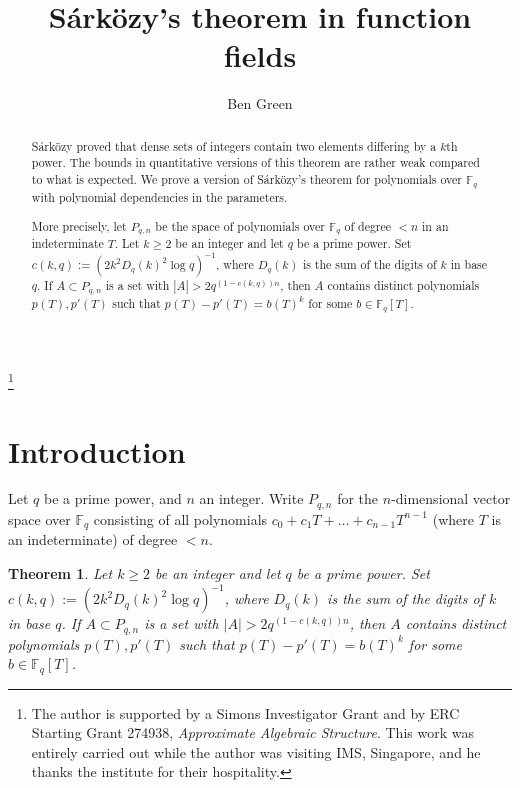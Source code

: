 \documentclass[12pt,reqno]{amsart}
\newtheorem{theorem}{Theorem}[section]
\theoremstyle{definition}
\renewcommand{\geq}{\geqslant}
\def\F{\mathbb{F}}
\numberwithin{equation}{section}
\begin{document}
\title[S\'ark\"ozy's theorem in function fields]{S\'ark\"ozy's theorem in function fields}


\author{Ben Green}
\address{Mathematical Institute, Radcliffe Observatory Quarter, Woodstock Rd, Oxford OX2 6GG}

\thanks{The author is supported by a Simons Investigator Grant and by ERC Starting Grant 274938, \emph{Approximate Algebraic Structure}. This work was entirely carried out while the author was visiting IMS, Singapore, and he thanks the institute for their hospitality.}


\begin{abstract}
S\'ark\"ozy proved that dense sets of integers contain two elements differing by a $k$th power. The bounds in quantitative versions of this theorem are rather weak compared to what is expected. We prove a version of S\'ark\"ozy's theorem for polynomials over $\F_q$ with polynomial dependencies in the parameters. 

More precisely, let $P_{q,n}$ be the space of polynomials over $\F_q$ of degree $< n$ in an indeterminate $T$.  Let $k \geq 2$ be an integer and let $q$ be a prime power. Set $c(k,q) := (2 k^2  D_q(k)^2\log q)^{-1}$, where $D_q(k)$ is the sum of the digits of $k$ in base $q$. If $A \subset P_{q,n}$ is a set with $|A| > 2q^{(1 - c(k,q))n}$, then $A$ contains distinct polynomials $p(T), p'(T)$ such that $p(T) - p'(T) = b(T)^k$ for some $b \in \F_q[T]$. 
\end{abstract}
\maketitle

\section{Introduction}
Let $q$ be a prime power, and $n$ an integer. Write $P_{q,n}$ for the $n$-dimensional vector space over $\F_q$ consisting of all polynomials $c_0 + c_1 T + \dots + c_{n-1} T^{n-1}$ (where $T$ is an indeterminate) of degree $< n$. 

\begin{theorem}\label{mainthm1}
Let $k \geq 2$ be an integer and let $q$ be a prime power. Set $c(k,q) := (2 k^2 D_q(k)^2\log q)^{-1}$, where $D_q(k)$ is the sum of the digits of $k$ in base $q$. If $A \subset P_{q,n}$ is a set with $|A| > 2q^{(1 - c(k,q))n}$, then $A$ contains distinct polynomials $p(T), p'(T)$ such that $p(T) - p'(T) = b(T)^k$ for some $b \in \F_q[T]$. \end{theorem}
\end{document}
